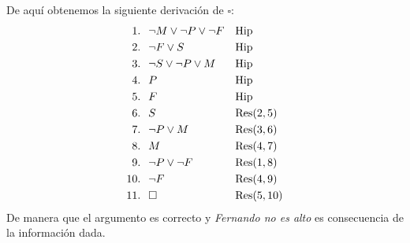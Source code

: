 \documentclass[8pt, letterpaper]{article}
\begin{document}
\begin{enumerate}
 De aquí obtenemos la siguiente derivación de $\square$:
 \begin{align*}
   1. \hspace{0.25cm}&\neg M  \lor\neg P \lor \neg F & &\text{Hip}\\
   2. \hspace{0.25cm}&\neg F \lor S & &\text{Hip}\\
   3. \hspace{0.25cm}&\neg S \lor \neg P \lor M & & \text{Hip}\\
   4. \hspace{0.25cm}&P & &\text{Hip}\\
   5. \hspace{0.25cm}&F & &\text{Hip}\\
   6. \hspace{0.25cm}&S & &\text{Res}(2,5)\\
   7. \hspace{0.25cm}&\neg P\lor M & &\text{Res}(3,6)\\
   8. \hspace{0.25cm}&M & &\text{Res}(4, 7)\\
   9. \hspace{0.25cm}&\neg P \lor \neg F & &\text{Res}(1,8)\\
   10. \hspace{0.25cm}&\neg F & &\text{Res}(4, 9)\\
   11. \hspace{0.25cm}&\square & &\text{Res}(5, 10)
 \end{align*}
 De manera que el argumento es correcto y {\it Fernando no es alto} es
 consecuencia de la información dada.
\end{enumerate}
\end{document}
